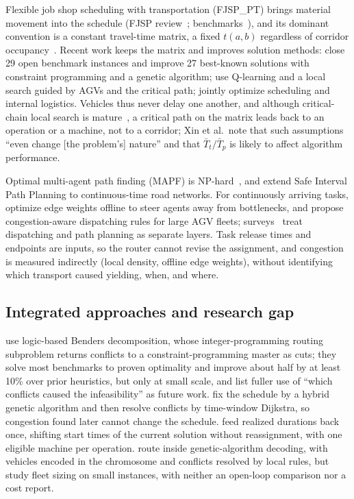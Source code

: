 \documentclass[preprint,review,12pt,authoryear,doubleblind]{elsarticle}
\begin{document}
Flexible job shop scheduling with transportation (FJSP\_PT) brings material movement into the schedule (FJSP review~\citep{dauzereperes2024fjsp}; benchmarks~\citep{homayouni2021production}), and its dominant convention is a constant travel-time matrix, a fixed $t(a,b)$ regardless of corridor occupancy~\citep{xin2025review}.
Recent work keeps the matrix and improves solution methods: \citet{meng2025cp} close 29 open benchmark instances and improve 27 best-known solutions with constraint programming and a genetic algorithm; \citet{qin2026knowledge} use Q-learning and a local search guided by AGVs and the critical path; \citet{jafarian2026integrated} jointly optimize scheduling and internal logistics.
Vehicles thus never delay one another, and although critical-chain local search is mature~\citep{otala2021graph,tamssaouet2023neighborhood}, a critical path on the matrix leads back to an operation or a machine, not to a corridor; Xin et al.\ note that such assumptions ``even change [the problem's] nature'' and that $\bar{T}_t/\bar{T}_p$ is likely to affect algorithm performance.

Optimal multi-agent path finding (MAPF) is NP-hard~\citep{gao2023mapf}, and \citet{kasaura2022sipp} extend Safe Interval Path Planning to continuous-time road networks.
For continuously arriving tasks, \citet{zhang2024guidance} optimize edge weights offline to steer agents away from bottlenecks, and \citet{kim2026congestion} propose congestion-aware dispatching rules for large AGV fleets; surveys~\citep{lu2022agv,fragapane2021planning} treat dispatching and path planning as separate layers.
Task release times and endpoints are inputs, so the router cannot revise the assignment, and congestion is measured indirectly (local density, offline edge weights), without identifying which transport caused yielding, when, and where.

\subsection{Integrated approaches and research gap}

 use logic-based Benders decomposition, whose integer-programming routing subproblem returns conflicts to a constraint-programming master as cuts; they solve most benchmarks to proven optimality and improve about half by at least 10\% over prior heuristics, but only at small scale, and list fuller use of ``which conflicts caused the infeasibility'' as future work.
\citet{sun2023integrated} fix the schedule by a hybrid genetic algorithm and then resolve conflicts by time-window Dijkstra, so congestion found later cannot change the schedule.
\citet{li2026framework} feed realized durations back once, shifting start times of the current solution without reassignment, with one eligible machine per operation.
\citet{lyu2019approach} route inside genetic-algorithm decoding, with vehicles encoded in the chromosome and conflicts resolved by local rules, but study fleet sizing on small instances, with neither an open-loop comparison nor a cost report.
\end{document}
